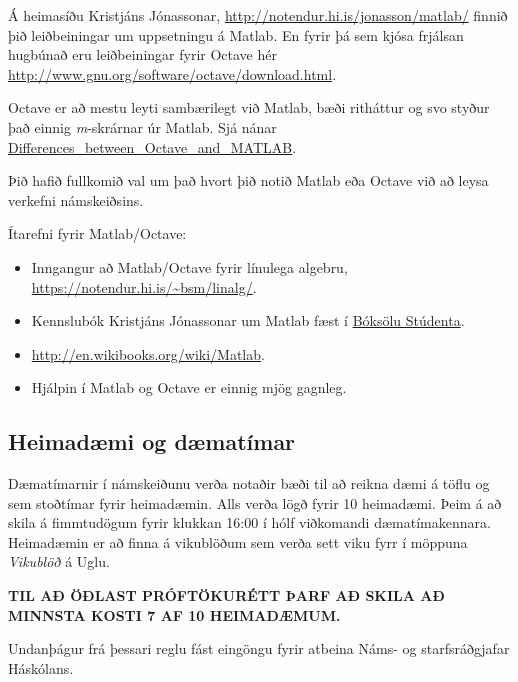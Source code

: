 \documentclass[letterpaper,10pt,icelandic]{sphinxmanual}
\begin{document}
Á heimasíðu Kristjáns Jónassonar, \href{http://notendur.hi.is/jonasson/matlab/}{http://notendur.hi.is/jonasson/matlab/} finnið þið leiðbeiningar um uppsetningu á Matlab. En fyrir þá sem kjósa frjálsan hugbúnað eru leiðbeiningar fyrir Octave hér \href{http://www.gnu.org/software/octave/download.html}{http://www.gnu.org/software/octave/download.html}.

Octave er að mestu leyti sambærilegt við Matlab, bæði ritháttur og svo styður það einnig \emph{m}-skrárnar úr Matlab. Sjá nánar \href{http://en.wikibooks.org/wiki/MATLAB\_Programming/Differences\_between\_Octave\_and\_MATLAB}{Differences\_between\_Octave\_and\_MATLAB}.

Þið hafið fullkomið val um það hvort þið notið Matlab eða Octave við að leysa verkefni námskeiðsins.

Ítarefni fyrir Matlab/Octave:
\begin{itemize}
\item {} 
Inngangur að Matlab/Octave fyrir línulega algebru, \href{https://notendur.hi.is/~bsm/linalg/}{https://notendur.hi.is/\textasciitilde{}bsm/linalg/}.

\item {} 
Kennslubók Kristjáns Jónassonar um Matlab fæst í \href{http://www.boksala.is/matlab-forritunarmal-fyrir-visindalega-utreikning.html}{Bóksölu Stúdenta}.

\item {} 
\href{http://en.wikibooks.org/wiki/Matlab}{http://en.wikibooks.org/wiki/Matlab}.

\item {} 
Hjálpin í Matlab og Octave er einnig mjög gagnleg.

\end{itemize}


\subsection{Heimadæmi og dæmatímar}
\label{vidauki:heimadaemi-og-daematimar}
Dæmatímarnir í námskeiðunu verða notaðir bæði til að reikna dæmi á töflu og sem stoðtímar fyrir heimadæmin. Alls verða lögð fyrir 10 heimadæmi. Þeim á að skila á fimmtudögum fyrir klukkan 16:00 í hólf viðkomandi dæmatímakennara. Heimadæmin er að finna á vikublöðum sem verða sett viku fyrr í möppuna \emph{Vikublöð} á Uglu.

\textbf{TIL AÐ ÖÐLAST PRÓFTÖKURÉTT ÞARF AÐ SKILA AÐ MINNSTA KOSTI 7 AF 10 HEIMADÆMUM.}

Undanþágur frá þessari reglu fást eingöngu fyrir atbeina Náms- og starfsráðgjafar Háskólans.
\end{document}
